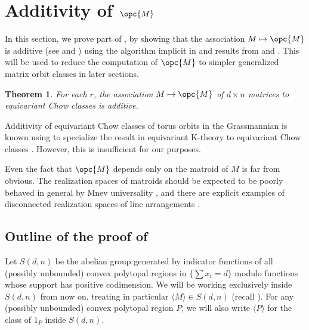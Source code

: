 \documentclass[12pt]{amsart}
\theoremstyle{plain}
\newtheorem{Thm}{Theorem}[section]
\theoremstyle{definition}
\theoremstyle{remark}
\begin{document}
\section{Additivity of $\opc{M}$}
\label{AMOC}
In this section, we prove part of , by showing that the association $M \mapsto \opc{M}$ is additive (see  and ) using the algorithm implicit in \cite[Appendix A]{Derksen} and results from  and . This will be used to reduce the computation of $\opc{M}$ to simpler generalized matrix orbit classes in later sections.

\begin{Thm} \label{realval}
For each $r$, the association $M \mapsto \opc{M}$ of $d \times n$ matrices to equivariant Chow classes is additive.
\end{Thm}

Additivity of equivariant Chow classes of torus orbits in the Grassmannian is known using \cite[Proposition 1.9]{KMS} to specialize the result in equivariant K-theory \cite[Example 3.5]{FS12} to equivariant Chow classes \cite[Section 2.2]{Fink}. However, this is insufficient for our purposes.

Even the fact that $\opc{M}$ depends only on the matroid of $M$ is far from obvious. The realization spaces of matroids should be expected to be poorly behaved in general by Mnev universality \cite[Theorem 1.3]{KM98} \cite{LV13}, and there are explicit examples of disconnected realization spaces of line arrangements \cite{Line1, Line5, Line3, Line4}.


\subsection{Outline of the proof of }
\label{outline}
Let $S(d,n)$ be the abelian group generated by indicator functions of all (possibly unbounded) convex polytopal regions in $\{ \sum x_i=d\}$ modulo functions whose support has positive codimension. We will be working exclusively inside $S(d,n)$ from now on, treating in particular $\langle M \rangle \in S(d,n)$ (recall ). For any (possibly unbounded) convex polytopal region $P$, we will also write $\langle P \rangle$ for the class of $1_P$ inside $S(d,n)$.
\end{document}
